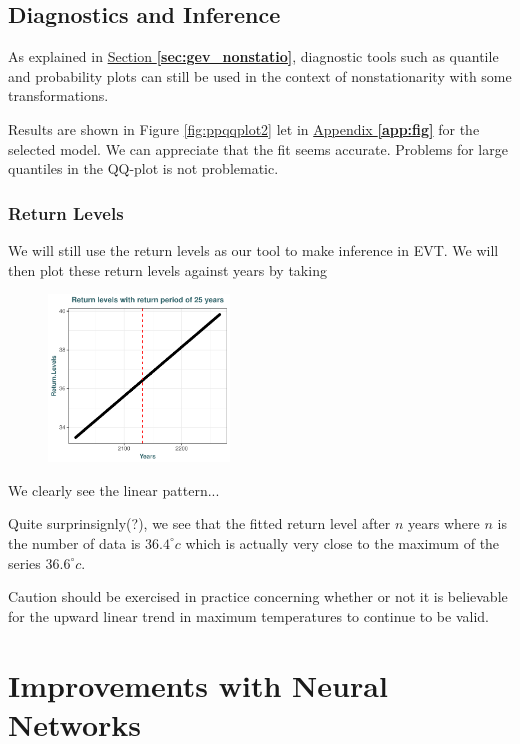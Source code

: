 \subsection{Diagnostics and Inference} 


As explained in \hyperref[sec:gev_nonstatio]{Section \textbf{\ref{sec:gev_nonstatio}}}, diagnostic tools such as quantile and probability plots can still be used in the context of nonstationarity with some transformations. 


Results are shown in Figure \ref{fig:ppqqplot2} let in \hyperref[app:fig]{Appendix \textbf{\ref{app:fig}}} for the selected model.
We can appreciate that the fit seems accurate. Problems for large quantiles in the QQ-plot is not problematic. 


\subsubsection*{Return Levels}


We will still use the return levels as our tool to make inference in EVT. We will then plot these return levels against years by taking 

\begin{figure}
	\centering
	\includegraphics[width=0.43\textwidth]{rl_nsta.pdf} %
	\caption{}
	\label{fig:rl_nsta}
\end{figure}

We clearly see the linear pattern...

Quite surprinsignly(?), we see that the fitted return level after $n$ years where $n$ is the number of data is $36.4^{\circ}c$ which is actually very close to the maximum of the series $36.6^{\circ}c$. 

Caution should be exercised in practice concerning whether or not it is believable
for the upward linear trend in maximum temperatures to continue to be valid.

\section{Improvements with Neural Networks}\label{sec:nnxp}



